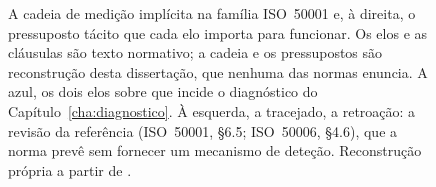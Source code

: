 \begin{figure}[H]
  \caption[A cadeia de medição normativa e os seus pressupostos tácitos]{A
   cadeia de medição implícita na família ISO~50001 e, à direita, o
   pressuposto tácito que cada elo importa para funcionar. Os elos e as
   cláusulas são texto normativo; a cadeia e os pressupostos são reconstrução
   desta dissertação, que nenhuma das normas enuncia. A azul, os dois elos
   sobre que incide o diagnóstico do Capítulo~\ref{cha:diagnostico}. À
   esquerda, a tracejado, a retroação: a revisão da referência (ISO~50001,
   \S6.5; ISO~50006, \S4.6), que a norma prevê sem fornecer um mecanismo de
   deteção. Reconstrução própria a partir
   de \cite{ISO50001_2018,ISO50006_2014,ISO50015_2014}.}
  \label{fig:cadeia-normativa}
\end{figure}
